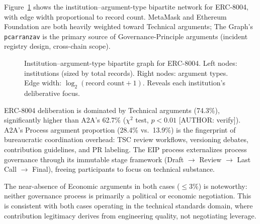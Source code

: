 \documentclass[conference]{IEEEtran}
\begin{document}
Figure~\ref{fig:bipartite} shows the institution--argument-type bipartite
network for ERC-8004, with edge width proportional to record count.
MetaMask and Ethereum Foundation are both heavily weighted toward
Technical arguments; The Graph's \texttt{pcarranzav} is the primary
source of Governance-Principle arguments (incident registry design,
cross-chain scope).

\begin{figure}[htbp]
  \centering
  \caption{Institution--argument-type bipartite graph for ERC-8004. Left nodes:
  institutions (sized by total records). Right nodes: argument types. Edge width:
  $\log_2(\text{record count}+1)$. Reveals each institution's deliberative focus.}
  \label{fig:bipartite}
\end{figure}

ERC-8004 deliberation is dominated by Technical arguments (74.3\%),
significantly higher than A2A's 62.7\% ($\chi^2$ test, $p<0.01$ [AUTHOR:
verify]). A2A's Process argument proportion (28.4\% vs.\ 13.9\%) is
the fingerprint of bureaucratic coordination overhead: TSC review workflows,
versioning debates, contribution guidelines, and PR labeling. The EIP
process externalizes process governance through its immutable stage
framework (Draft $\to$ Review $\to$ Last Call $\to$ Final), freeing
participants to focus on technical substance.

The near-absence of Economic arguments in both cases ($\leq 3\%$) is
noteworthy: neither governance process is primarily a political or
economic negotiation. This is consistent with both cases operating in
the technical standards domain, where contribution legitimacy derives
from engineering quality, not negotiating leverage.
\end{document}
